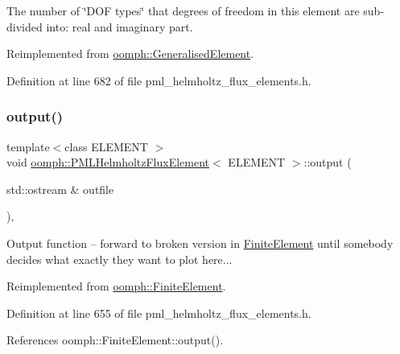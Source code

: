 The number of \char`\"{}\+D\+O\+F types\char`\"{} that degrees of freedom in this element are sub-\/divided into\+: real and imaginary part. 



Reimplemented from \hyperlink{classoomph_1_1GeneralisedElement_a0c6037a870597b35dcf1c780710b9a56}{oomph\+::\+Generalised\+Element}.



Definition at line 682 of file pml\+\_\+helmholtz\+\_\+flux\+\_\+elements.\+h.

\mbox{\label{classoomph_1_1PMLHelmholtzFluxElement_af8956e992516fb436d9f0947ac95d894}} 
\subsubsection{\texorpdfstring{output()}{output()}\hspace{0.1cm}{\footnotesize\ttfamily [1/4]}}
{\footnotesize\ttfamily template$<$class E\+L\+E\+M\+E\+NT $>$ \\
void \hyperlink{classoomph_1_1PMLHelmholtzFluxElement}{oomph\+::\+P\+M\+L\+Helmholtz\+Flux\+Element}$<$ E\+L\+E\+M\+E\+NT $>$\+::output (\begin{DoxyParamCaption}\item[{std\+::ostream \&}]{outfile }\end{DoxyParamCaption})\hspace{0.3cm}{\ttfamily [inline]}, {\ttfamily [virtual]}}

Output function -- forward to broken version in \hyperlink{classoomph_1_1FiniteElement}{Finite\+Element} until somebody decides what exactly they want to plot here... 

Reimplemented from \hyperlink{classoomph_1_1FiniteElement_a2ad98a3d2ef4999f1bef62c0ff13f2a7}{oomph\+::\+Finite\+Element}.



Definition at line 655 of file pml\+\_\+helmholtz\+\_\+flux\+\_\+elements.\+h.



References oomph\+::\+Finite\+Element\+::output().

\mbox{\label{classoomph_1_1PMLHelmholtzFluxElement_a35c5a4002aa8752b2d44e6c9abc9e6bd}} 
